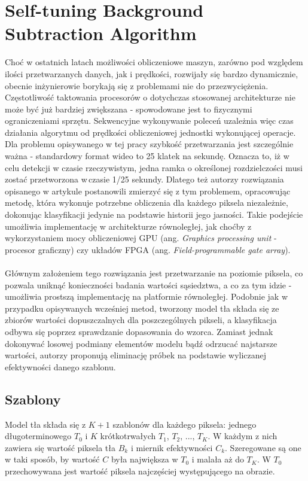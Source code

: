\section{Self-tuning Background Subtraction Algorithm}
\label{sec:BinWang}
Choć w ostatnich latach możliwości obliczeniowe maszyn, zarówno pod względem ilości przetwarzanych danych, jak i prędkości, rozwijały się bardzo dynamicznie, obecnie inżynierowie borykają się z problemami nie do przezwyciężenia. Częstotliwość taktowania procesorów o dotychczas stosowanej architekturze nie może być już bardziej zwiększana - spowodowane jest to fizycznymi ograniczeniami sprzętu. Sekwencyjne wykonywanie poleceń uzależnia więc czas działania algorytmu od prędkości obliczeniowej jednostki wykonującej operacje. Dla problemu opisywanego w tej pracy szybkość przetwarzania jest szczególnie ważna - standardowy format wideo to 25 klatek na sekundę. Oznacza to, iż w celu detekcji w czasie rzeczywistym, jedna ramka o określonej rozdzielczości musi zostać przetworzona w\,czasie 1/25 sekundy. Dlatego też autorzy rozwiązania opisanego w artykule \cite{6910012} postanowili zmierzyć się z tym problemem, opracowując metodę, która wykonuje potrzebne obliczenia dla każdego piksela niezależnie, dokonując klasyfikacji jedynie na podstawie historii jego jasności. Takie podejście umożliwia implementację w architekturze równoległej, jak choćby z wykorzystaniem mocy obliczeniowej GPU (ang. \textit{Graphics processing unit} - procesor graficzny) czy układów FPGA (ang. \textit{Field-programmable gate array}).
\paragraph{}
Głównym założeniem tego rozwiązania jest przetwarzanie na poziomie piksela, co pozwala uniknąć konieczności badania wartości sąsiedztwa, a co za tym idzie - umożliwia prostszą implementację na platformie równoległej. Podobnie jak w przypadku opisywanych wcześniej metod, tworzony model tła składa się ze zbiorów wartości dopuszczalnych dla poszczególnych pikseli, a klasyfikacja odbywa się poprzez sprawdzanie dopasowania do wzorca. Zamiast jednak dokonywać losowej podmiany elementów modelu bądź odrzucać najstarsze wartości, autorzy proponują eliminację próbek na podstawie wyliczanej efektywności danego szablonu.
\subsection{Szablony}
Model tła składa się z $K+1$ szablonów dla każdego piksela: jednego długoterminowego $T_{0}$ i $K$ krótkotrwałych $T_{1}$, $T_{2}$, ..., $T_{K}$. W każdym z nich zawiera się wartość piksela tła $B_{k}$ i miernik efektywności $C_{k}$. Szeregowane są one w taki sposób, by wartość $C$ była największa w $T_{0}$ i malała aż do $T_{K}$. W $T_{0}$ przechowywana jest wartość piksela najczęściej występującego na obrazie.
